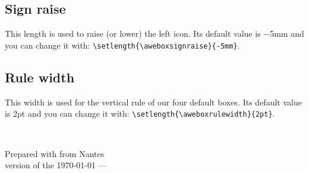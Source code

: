\documentclass[a4paper,12pt]{article}
\def\abIconHeart{\symbol{"F004}}
\newcommand{\colophon}{
  ~\vfill
  \begin{center}
    \scriptsize Prepared with {\ABFamily\abIconHeart} from Nantes\\
    \tiny version of the \today{} --- \currenttime
  \end{center}
}
\begin{document}
\subsection{Sign raise}

This length is used to raise (or lower) the left icon. Its default value
is −5mm and you can change it with:
\verb!\setlength{\aweboxsignraise}{-5mm}!.

\subsection{Rule width}

This width is used for the vertical rule of our four default boxes. Its
default value is 2pt and you can change it with:
\verb!\setlength{\aweboxrulewidth}{2pt}!.


\colophon
\end{document}
